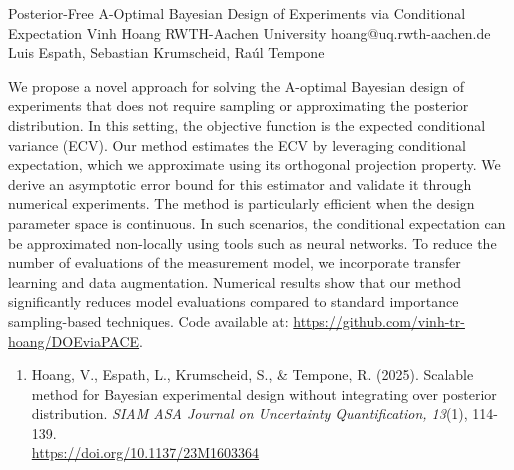 \begin{talk}
  {Posterior-Free A-Optimal Bayesian Design of Experiments via Conditional Expectation}%
  {Vinh Hoang}%
  {RWTH-Aachen University}%
  {hoang@uq.rwth-aachen.de}%
  {Luis Espath, Sebastian Krumscheid, Ra\'ul Tempone}%
  
    
   

\medskip

We propose a novel approach for solving the A-optimal Bayesian design of experiments that does not require sampling or approximating the posterior distribution. In this setting, the objective function is the expected conditional variance (ECV).
Our method estimates the ECV by leveraging conditional expectation, which we approximate using its orthogonal projection property. We derive an asymptotic error bound for this estimator and validate it through numerical experiments.
The method is particularly efficient when the design parameter space is continuous. In such scenarios, the conditional expectation can be approximated non-locally using tools such as neural networks. To reduce the number of evaluations of the measurement model, we incorporate transfer learning and data augmentation.
Numerical results show that our method significantly reduces model evaluations compared to standard importance sampling-based techniques.
Code available at: \href{https://github.com/vinh-tr-hoang/DOEviaPACE}{https://github.com/vinh-tr-hoang/DOEviaPACE}.

\begin{enumerate}
    \item [{[1]}] Hoang, V., Espath, L., Krumscheid, S., \& Tempone, R. (2025).  
    Scalable method for Bayesian experimental design without integrating over posterior distribution. {\it SIAM ASA Journal on Uncertainty Quantification, 13}(1), 114-139. \\
    \href{https://doi.org/10.1137/23M1603364}{https://doi.org/10.1137/23M1603364}
\end{enumerate}


\end{talk}

